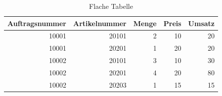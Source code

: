 \begin{table}[htbp]
  \centering
  \caption{Flache Tabelle}
  \label{tab:Flache_Tabelle}
  \begin{tabular}{rrrrr}
    \toprule
    Auftragsnummer & Artikelnummer & Menge & Preis & Umsatz \\
    \midrule
    10001 & 20101 & 2 & 10 & 20 \\
    10001 & 20201 & 1 & 20 & 20 \\
    10002 & 20101 & 3 & 10 & 30 \\
    10002 & 20201 & 4 & 20 & 80 \\
    10002 & 20203 & 1 & 15 & 15 \\
    \bottomrule
  \end{tabular}
\end{table}
